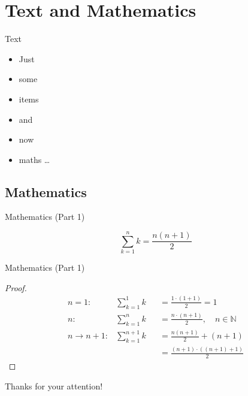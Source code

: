 \section{Text and Mathematics}
\begin{frame}{Text}
	\begin{itemize}
		\item Just
		\item some
		\item items
		\item and
		\item now
		\item maths \dots
	\end{itemize}
\end{frame}


\subsection[Maths]{Mathematics}
\begin{frame}{Mathematics (Part 1)}
 	\begin{corollary}
 	\[
 	\sum_{k=1}^n k = \frac{n(n + 1)}{2}
 	\]
 	\end{corollary}
\end{frame}


\begin{frame}{Mathematics (Part 1)}
 	\begin{proof}
	 	\begin{align}
 			n = 1: & \sum_{k=1}^1 k & 					&= \frac{1 \cdot (1 + 1)}{2} = 1\\
 			n: & \sum_{k=1}^n k &  					&= \frac{n \cdot (n + 1)}{2}, \quad n \in \mathbb{N}\\
 			n \rightarrow n+1: & \sum_{k=1}^{n+1} k &   &= \frac{n(n + 1)}{2} + (n + 1)\\
 			& & 										&= \frac{(n + 1) \cdot ((n + 1) + 1)}{2}
 		\end{align}
 	\end{proof}
\end{frame}


\begin{frame}{Thanks for your attention!}
	\printbibliography
\end{frame}
